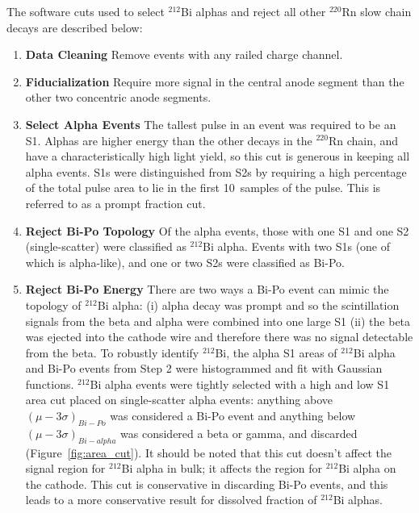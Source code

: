 The software cuts used to select $^{212}$Bi alphas and reject all other $^{220}$Rn slow chain decays are described below: 
\begin{enumerate}
\item \textbf{Data Cleaning} Remove events with any railed charge channel.
\item \textbf{Fiducialization} Require more signal in the central anode segment than the other two concentric anode segments.
\item \textbf{Select Alpha Events} The tallest pulse in an event was required to be an S1. Alphas are higher energy than the other decays in the $^{220}$Rn chain, and have a characteristically high light yield, so this cut is generous in keeping all alpha events. S1s were distinguished from S2s by requiring a high percentage of the total pulse area to lie in the first 10~samples of the pulse. This is referred to as a prompt fraction cut.
\item \textbf{Reject Bi-Po Topology} Of the alpha events, those with one S1 and one S2 (single-scatter) were classified as $^{212}$Bi alpha. Events with two S1s (one of which is alpha-like), and one or two S2s were classified as Bi-Po.
\item \textbf{Reject Bi-Po Energy} There are two ways a Bi-Po event can mimic the topology of $^{212}$Bi alpha: (i) alpha decay was prompt and so the scintillation signals from the beta and alpha were combined into one large S1 (ii) the beta was ejected into the cathode wire and therefore there was no signal detectable from the beta. To robustly identify $^{212}$Bi, the alpha S1 areas of $^{212}$Bi alpha and Bi-Po events from Step 2 were histogrammed and fit with Gaussian functions. $^{212}$Bi alpha events were tightly selected with a high and low S1 area cut placed on single-scatter alpha events: anything above $(\mu - 3\sigma)_{Bi-Po}$ was considered a Bi-Po event and anything below $(\mu - 3\sigma)_{Bi-alpha}$ was considered a beta or gamma, and discarded (Figure~\ref{fig:area_cut}). It should be noted that this cut doesn't affect the signal region for $^{212}$Bi alpha in bulk; it affects the region for $^{212}$Bi alpha on the cathode. This cut is conservative in discarding Bi-Po events, and this leads to a more conservative result for dissolved fraction of $^{212}$Bi alphas.

\end{enumerate}

